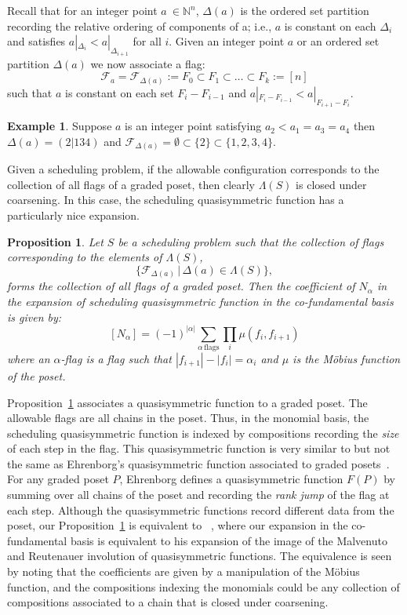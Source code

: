 \documentclass[12pt,reqno]{amsart}
\numberwithin{definition}{section}
\newtheorem{proposition}[definition]{Proposition}
\theoremstyle{definition}
\newtheorem{example}[definition]{Example}
\newcommand{\allow}{\Lambda} %
\begin{document}
  Recall that for an integer point $a\ \in \mathbb{N}^n$,
  $\Delta(a)$ is the ordered set partition recording the relative
  ordering of components of a; i.e., $a$ is constant on each $\Delta_i$
  and satisfies $a|_{\Delta_i} < a|_{\Delta_{i+1}}$ for all $i$.
Given an integer point $a$ or an ordered set partition $\Delta(a)$ we now associate a flag:
$$\mathscr{F}_{a} = \mathscr{F}_{\Delta(a)} := F_0 \subset F_1 \subset \ldots \subset F_k := [n]$$
such that $a$ is constant on each set $F_i - F_{i-1}$ and  $a|_{F_i -
  F_{i-1}} < a|_{F_{i+1} - F_{i}} $. 

\begin{example}
Suppose $a$ is an integer point satisfying $a_2 < a_1 = a_3 = a_4$ then $\Delta(a) = (2|134)$ and $\mathscr{F}_{\Delta(a)} = {\emptyset \subset \{2\} \subset \{1,2,3,4\}}$.
\end{example}



Given a scheduling problem, if the allowable configuration corresponds
to the collection of all flags of a graded poset, then clearly $\allow(S)$ is closed under coarsening.  In this case, the scheduling 
quasisymmetric function has a particularly nice expansion.

\begin{proposition}
\label{prop:flags}
Let $S$ be a scheduling problem such that the collection of flags corresponding to the elements of $\allow(S)$,
$$\{ \mathscr{F}_{\Delta(a)} \, | \, \Delta(a) \in \allow(S) \},$$
forms the collection of all flags of a graded poset.  Then the coefficient of $N_{\alpha}$ in the expansion of scheduling quasisymmetric function in the co-fundamental basis is given by:
$$[N_{\alpha}] = (-1)^{|\alpha|} \sum_{\alpha \, \textrm{flags}} \prod_i \mu(f_i,f_{i+1})$$
where an $\alpha$-flag is a flag such that $|f_{i+1}| - |f_i| = \alpha_i$ and $\mu$ is the M\"{o}bius function of the poset.
\end{proposition}



Proposition~\ref{prop:flags} associates a quasisymmetric function to a
graded poset.  The allowable flags are all chains in the poset.  Thus,
in the monomial basis, the scheduling quasisymmetric function is indexed
by compositions recording the \emph{size} of each step in the flag.  This
quasisymmetric function is very similar to but not the same as
Ehrenborg's quasisymmetric function associated to graded
posets~\cite{Ehrenborg}.  For any graded poset $P$, Ehrenborg defines
a quasisymmetric function $F(P)$ by summing over all chains of the
poset and recording the \emph{rank jump} of the flag at each step.  Although
the quasisymmetric functions record different data from the poset, our
Proposition~\ref{prop:flags} is equivalent to
~\cite[Proposition~5.1]{Ehrenborg}, where our expansion in the
co-fundamental basis is equivalent to his expansion of the image of
the Malvenuto and Reutenauer involution of quasisymmetric functions.
The equivalence is seen by noting that the coefficients are given by a
manipulation of the M\"obius function, and the compositions indexing the
monomials could be any collection of compositions associated to a
chain that is closed under coarsening.
\end{document}
